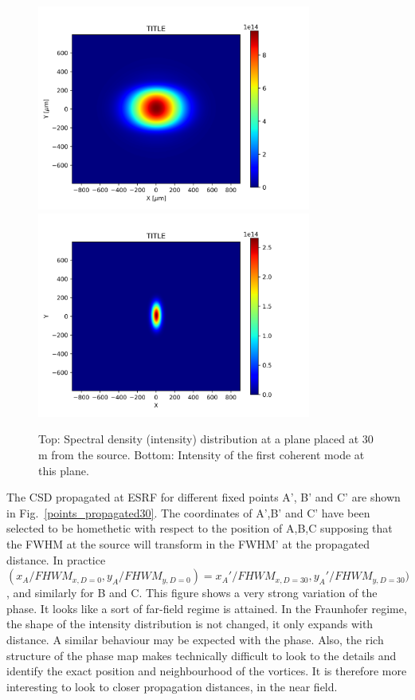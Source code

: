 \documentclass{iucr}              %
\newcommand{\inblue}[1]{{\color{blue}#1}}
\begin{document}
\begin{figure}\label{spectral_density_propagated}
\caption{Top: Spectral density (intensity) distribution at a plane placed at 30 m from the source. Bottom: Intensity of the first coherent mode at this plane.}
\includegraphics[width=9.0cm]{Figures/spectral_density_upto1099_propagated.png}
\includegraphics[width=9.0cm]{Figures/spectral_density_upto0000_propagated.png}
\end{figure}

The CSD propagated at ESRF for different fixed points A', B' and C' are shown in \inblue{Fig.~\ref{points_propagated30}}. The coordinates of A',B' and C' have been selected to be homethetic with respect to the position of A,B,C supposing that the FWHM at the source will transform in the FWHM' at the propagated distance. In practice $(x_A/FHWM_{x,D=0},y_A/FHWM_{y,D=0})=x_A'/FHWM_{x,D=30},y_A'/FHWM_{y,D=30})$, and similarly for B and C. This figure shows a very strong variation of the phase. It looks like a sort of far-field regime is attained. In the Fraunhofer regime, the shape of the intensity distribution is not changed, it only expands with distance. A similar behaviour may be expected with the phase. Also, the rich structure of the phase map makes technically difficult to look to the details and identify the exact position and neighbourhood of the vortices. It is therefore more interesting to look to closer propagation distances, in the near field. 
\end{document}
